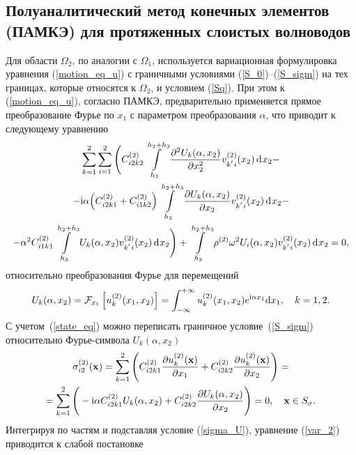 \documentclass[press]{vestnik}
\begin{document}
	\subsection{Полуаналитический метод конечных элементов (ПАМКЭ) для протяженных слоистых волноводов} \label{SAFE}
Для области $\Omega_{2}$, по аналогии с $\Omega_{1}$, используется вариационная формулировка уравнения (\ref{motion_eq_u}) с граничными условиями (\ref{S_0})–(\ref{S_sigm}) на тех границах, которые относятся к $\Omega_{2}$, и условием (\ref{Sq}). При этом к (\ref{motion_eq_u}), согласно ПАМКЭ, предварительно применяется прямое преобразование Фурье по $x_{1}$ с параметром преобразования $\alpha$, что приводит к следующему уравнению
\begin{multline}\label{var_2}
	\sum_{k=1}^{2} \sum_{i=1}^{2} 
	\Bigg(
	C_{i2k2}^{(2)} \int\limits_{h_{3}}^{h_{2}+h_{3}} \frac{\partial^{2} U_{k}(\alpha,x_{2}) }{\partial x_{2}^{2} } v_{k^{'}i}^{(2)}(x_{2}) \d x_{2} -
	\\
	- {\rm{i}} \alpha \Big( C_{i2k1}^{(2)} +C_{i1k2}^{(2)} \Big) \int\limits_{h_{3}}^{h_{2}+h_{3}} \frac{\partial U_{k}(\alpha,x_{2}) }{\partial x_{2} } v_{k^{'}i}^{(2)}(x_{2}) \d x_{2} -
	\\
	-\alpha^{2} C_{i1k1}^{(2)} \int\limits_{h_{3}}^{h_{2}+h_{3}} U_{k}(\alpha,x_{2}) v_{k^{'}i}^{(2)}(x_{2}) \d x_{2}
	\Bigg)
	+ \int\limits_{h_{3}}^{h_{2}+h_{3}} \rho^{(2)} \omega^{2} U_{i}(\alpha,x_{2}) v_{k^{'}i}^{(2)}(x_{2}) \d x_{2} = 0,
\end{multline}
относительно преобразования Фурье для перемещений
$$
U_{k}(\alpha,x_2) = \mathcal{F}_{x_1} \left[  u_{k}^{(2)}(x_1,x_2) \right] = \int_{-\infty}^{+\infty} u_{k}^{(2)}(x_1,x_2) e^{{\rm{i}} \alpha x_1}\text{d}x_1, \quad k=1,2.
$$
С учетом~(\ref{state_eq}) можно переписать граничное условие~(\ref{S_sigm}) относительно Фурье-символа $U_{k}(\alpha,x_{2})$
\begin{multline} \label{sigma_U}
	\sigma_{i2}^{(2)}(\bm{x})=\sum_{k=1}^{2}    
	\Bigg(
	C_{i2k1}^{(2)} \frac{\partial u_{k}^{(2)}(\bm{x}) }{\partial x_{1} } + C_{i2k2}^{(2)} \frac{\partial u_{k}^{(2)}(\bm{x}) }{\partial x_{2} } 
	\Bigg) = 
	\\
	=\sum_{k=1}^{2}    
	\Bigg(
	- {\rm{i}} \alpha C_{i2k1}^{(2)} U_{k}(\alpha,x_{2}) + C_{i2k2}^{(2)} \frac{\partial U_{k}(\alpha,x_{2}) }{\partial x_{2} } 
	\Bigg) = 0, \quad {\bm{x}} \in S_{\sigma}.
\end{multline}
Интегрируя по частям и подставляя условие (\ref{sigma_U}), уравнение (\ref{var_2}) приводится к слабой постановке
\end{document}
